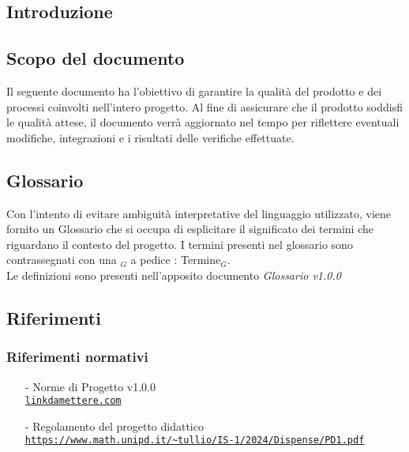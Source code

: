 \documentclass[10pt]{article}
\begin{document}
\newpage
\tableofcontents
\listoffigures %
\listoftables %
\newpage
\begin{justify}

\section{Introduzione}

\subsection{Scopo del documento}
Il seguente documento ha l'obiettivo di garantire la qualità del prodotto e dei processi coinvolti nell'intero progetto. Al fine di assicurare che il prodotto soddisfi le qualità attese, il documento
verrà aggiornato nel tempo per riflettere eventuali modifiche, integrazioni e i risultati delle verifiche effettuate.


\subsection{Glossario}
Con l'intento di evitare ambiguità interpretative del linguaggio utilizzato, viene fornito un Glossario che si occupa di esplicitare il significato dei termini che riguardano il contesto del progetto. I termini presenti nel glossario sono contrassegnati con una $_G$ a pedice : Termine$_G$.\\
Le definizioni sono presenti nell'apposito documento \textit{Glossario v1.0.0}


\subsection{Riferimenti}


\subsubsection{Riferimenti normativi}
\begin{itemize}
    \item[-] Norme di Progetto v1.0.0\\
    \textcolor{blue}{\texttt{\url{linkdamettere.com}}}

    \item[-] Regolamento del progetto didattico  \\
    \textcolor{blue}{\texttt{\url{https://www.math.unipd.it/~tullio/IS-1/2024/Dispense/PD1.pdf}}}


\end{itemize}
\end{justify}
\end{document}
